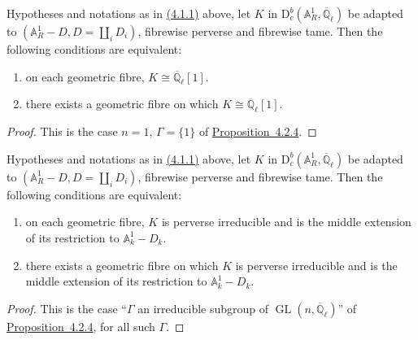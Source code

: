 Hypotheses and notations as in \hyperref[par:4.1.1]{(4.1.1)} above, let \(K\)
in \(\mathrm{D}^b_c(\mathbb{A}^1_R,\overline{\mathbb{Q}}_\ell)\) be adapted to
\((\mathbb{A}^1_R-D,D=\coprod_iD_i)\), fibrewise perverse and fibrewise tame.
Then the following conditions are equivalent:
\begin{enumerate}[label=(\arabic*)]
\item on each geometric fibre, \(K\cong\overline{\mathbb{Q}}_\ell[1]\).
\item there exists a geometric fibre on which
\(K\cong\overline{\mathbb{Q}}_\ell[1]\).
\end{enumerate}

\begin{proof}
This is the case \(n=1\), \(\Gamma=\{1\}\) of
\hyperref[prop:4.2.4]{Proposition~4.2.4}.
\end{proof}

Hypotheses and notations as in \hyperref[par:4.1.1]{(4.1.1)} above, let \(K\)
in \(\mathrm{D}^b_c(\mathbb{A}^1_R,\overline{\mathbb{Q}}_\ell)\) be adapted to
\((\mathbb{A}^1_R-D,D=\coprod_iD_i)\), fibrewise perverse and fibrewise tame.
Then the following conditions are equivalent:
\begin{enumerate}[label=(\arabic*)]
\item on each geometric fibre, \(K\) is perverse irreducible and is the middle
extension of its restriction to \(\mathbb{A}^1_k-D_k\).
\item there exists a geometric fibre on which \(K\) is perverse irreducible and
is the middle extension of its restriction to \(\mathbb{A}^1_k-D_k\).
\end{enumerate}

\begin{proof}
This is the case ``\(\Gamma\) an irreducible subgroup of
\(\operatorname{GL}(n,\overline{\mathbb{Q}}_\ell)\)'' of
\hyperref[prop:4.2.4]{Proposition~4.2.4}, for all such \(\Gamma\).
\end{proof}

